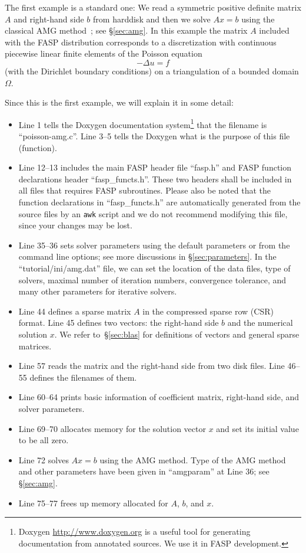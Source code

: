 \documentclass[11pt]{memoir}
\begin{document}
The first example is a standard one: We read a symmetric
positive definite matrix $A$ and right-hand side $b$ from harddisk and then we solve
$Ax=b$ using the classical AMG
method~\cite{Brandt.BrandtMcCormick.1982uq,Ruge.RugeStuben.1985ij,Ruge.RugeStuben.1987bs};
see \S\ref{sec:amg}. In this example the matrix $A$ included with the
FASP distribution corresponds to a discretization with continuous
piecewise linear finite elements of the Poisson equation
$$-\Delta u = f$$ (with the Dirichlet boundary conditions) on a
triangulation of a bounded domain $\Omega$.
%

%
Since this is the first example, we will explain it in some detail:
\begin{itemize}
%
\item Line 1 tells the Doxygen documentation system\footnote{Doxygen \url{http://www.doxygen.org} is a useful tool for generating documentation from annotated sources. We use it in FASP development.} that the filename
  is ``poisson-amg.c''. Line 3--5 tells the Doxygen what is the
  purpose of this file (function).
%
\item Line 12--13 includes the main FASP header file ``fasp.h'' and
  FASP function declarations header ``fasp\_functs.h''. These two
  headers shall be included in all files that requires FASP
  subroutines. Please also be noted that the function declarations in
  ``fasp\_functs.h'' are automatically generated from the source files
  by an \verb|awk| script and we do not recommend modifying this file,
  since your changes may be lost. 
%
\item Line 35--36 sets solver parameters using the default parameters or
  from the command line options; see more discussions in
  \S\ref{sec:parameters}. In the ``tutorial/ini/amg.dat'' file, we can
  set the location of the data files, type of solvers, maximal number
  of iteration numbers, convergence tolerance, and many other
  parameters for iterative solvers.
%
\item Line 44 defines a sparse matrix $A$ in the compressed sparse row
  (CSR) format. Line 45 defines two vectors: the right-hand side $b$
  and the numerical solution $x$. We refer to~\S\ref{sec:blas} for
  definitions of vectors and general sparse matrices.
%
\item Line 57 reads the matrix and the right-hand side from two disk
  files. Line 46--55 defines the filenames of them.
%
\item Line 60--64 prints basic information of coefficient matrix,
  right-hand side, and solver parameters.
%
\item Line 69--70 allocates memory for the solution vector $x$ and set
  its initial value to be all zero.
%
\item Line 72 solves $Ax=b$ using the AMG method. Type of the AMG
  method and other parameters have been given in ``amgparam'' at Line
  36; see \S\ref{sec:amg}.
%
\item Line 75--77 frees up memory allocated for $A$, $b$, and $x$.
\end{itemize}
\end{document}
